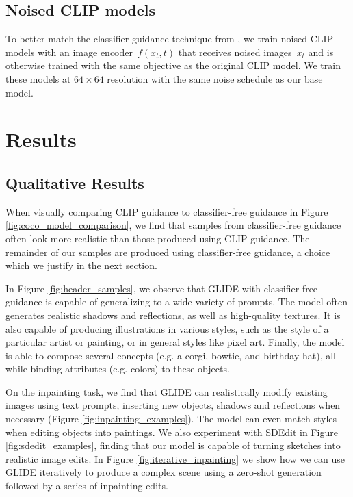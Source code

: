\subsection{Noised CLIP models}
\label{sec:clipguided_diffusion}

To better match the classifier guidance technique from \citet{sotapaper}, we train noised CLIP models with an image encoder~$f(x_t, t)$ that receives noised images~$x_t$ and is otherwise trained with the same objective as the original CLIP model. We train these models at $64 \times 64$ resolution with the same noise schedule as our base model.

\section{Results}
\label{sec:results}

\subsection{Qualitative Results}
\label{sec:qualitative_results}

When visually comparing CLIP guidance to classifier-free guidance in Figure \ref{fig:coco_model_comparison}, we find that samples from classifier-free guidance often look more realistic than those produced using CLIP guidance. The remainder of our samples are produced using classifier-free guidance, a choice which we justify in the next section.

In Figure \ref{fig:header_samples}, we observe that GLIDE with classifier-free guidance is capable of generalizing to a wide variety of prompts. The model often generates realistic shadows and reflections, as well as high-quality textures. It is also capable of producing illustrations in various styles, such as the style of a particular artist or painting, or in general styles like pixel art. Finally, the model is able to compose several concepts (e.g. a corgi, bowtie, and birthday hat), all while binding attributes (e.g. colors) to these objects.

On the inpainting task, we find that GLIDE can realistically modify existing images using text prompts, inserting new objects, shadows and reflections when necessary (Figure \ref{fig:inpainting_examples}). The model can even match styles when editing objects into paintings. We also experiment with SDEdit \mbox{\citep{sdedit}} in Figure \ref{fig:sdedit_examples}, finding that our model is capable of turning sketches into realistic image edits. In Figure \ref{fig:iterative_inpainting} we show how we can use GLIDE iteratively to produce a complex scene using a zero-shot generation followed by a series of inpainting edits.

